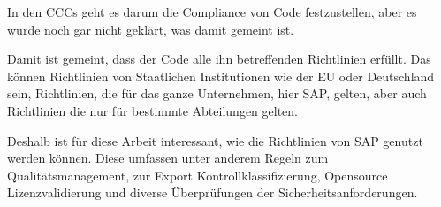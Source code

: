 \documentclass[../main.tex]{subfiles}
\begin{document}
In den \glspl{CCC} geht es darum die Compliance von Code festzustellen, aber es wurde noch gar nicht geklärt, was damit gemeint ist.

Damit ist gemeint, dass der Code alle ihn betreffenden Richtlinien erfüllt.
Das können Richtlinien von Staatlichen Institutionen wie der \gls{EU} oder Deutschland sein, Richtlinien, die für das ganze Unternehmen, hier SAP, gelten, aber auch Richtlinien die nur für bestimmte Abteilungen gelten.

Deshalb ist für diese Arbeit interessant, wie die Richtlinien von SAP genutzt werden können.
Diese umfassen unter anderem Regeln zum Qualitätsmanagement, zur Export Kontrollklassifizierung, Opensource Lizenzvalidierung und diverse Überprüfungen der Sicherheitsanforderungen.
\end{document}
